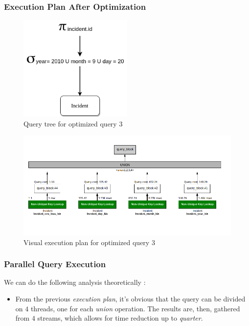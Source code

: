 \subsubsection{Execution Plan After Optimization}
\begin{figure}[H]
    \centering
    \includegraphics[width=0.5\textwidth]{images/query_trees/query3-optimized-and-non-optimized.png}
    \caption{Query tree for optimized query 3}
\end{figure}
\begin{figure}[H]
    \centering
    \includegraphics[width=\textwidth]{images/execution_plans/q3-3-new.png}
    \caption{Visual execution plan for optimized query 3}
\end{figure}

\subsubsection{Parallel Query Execution}
We can do the following analysis theoretically :
\begin{itemize}
    \item From the previous \emph{execution plan}, it's obvious that the query can be divided on $4$ threads, one for each \emph{union} operation. The results are, then, gathered from $4$ streams, which allows for time reduction up to \emph{quarter}.
\end{itemize}

